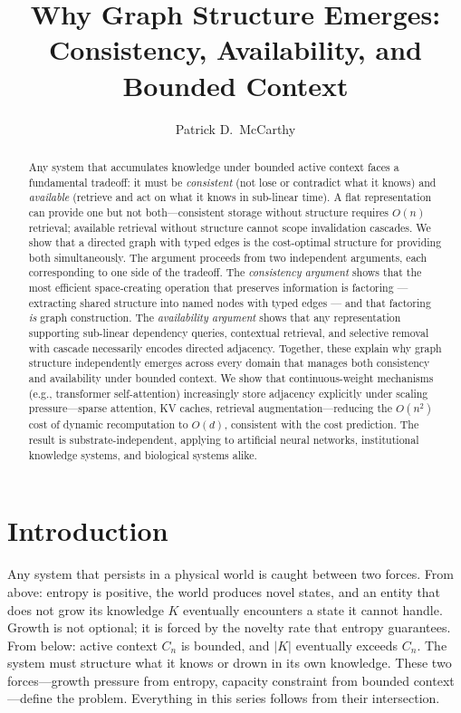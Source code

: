 \documentclass[11pt]{article}
\title{Why Graph Structure Emerges:\\Consistency, Availability, and Bounded Context}
\author{Patrick D.\ McCarthy}
\date{}
\theoremstyle{definition}
\begin{document}
\maketitle

\begin{abstract}
Any system that accumulates knowledge under bounded active context
faces a fundamental tradeoff: it must be \emph{consistent}
(not lose or contradict what it knows) and \emph{available}
(retrieve and act on what it knows in sub-linear time). A flat
representation can provide one but not both---consistent storage
without structure requires $O(n)$ retrieval; available retrieval
without structure cannot scope invalidation cascades.
We show that a directed graph with typed edges is the cost-optimal
structure for providing both simultaneously. The argument proceeds
from two independent arguments, each corresponding to one side of
the tradeoff. The \emph{consistency argument} shows that the most efficient
space-creating operation that preserves information is factoring
--- extracting shared structure into named nodes with typed edges ---
and that factoring \emph{is} graph construction. The
\emph{availability argument} shows that any representation supporting
sub-linear dependency queries, contextual retrieval, and selective
removal with cascade necessarily encodes directed adjacency.
Together, these explain why graph structure independently emerges
across every domain that manages both consistency and availability
under bounded context.
We show that continuous-weight mechanisms (e.g., transformer
self-attention) increasingly store adjacency explicitly under scaling
pressure---sparse attention, KV caches, retrieval augmentation---reducing
the $O(n^2)$ cost of dynamic recomputation to $O(d)$, consistent with
the cost prediction. The result is substrate-independent, applying
to artificial neural networks, institutional knowledge systems, and
biological systems alike.
\end{abstract}

\section{Introduction}
\label{sec:intro}

Any system that persists in a physical world is caught between two
forces. From above: entropy is positive, the world produces novel
states, and an entity that does not grow its knowledge $K$ eventually
encounters a state it cannot handle. Growth is not optional; it is
forced by the novelty rate that entropy guarantees. From below:
active context $C_n$ is bounded, and $|K|$ eventually exceeds $C_n$.
The system must structure what it knows or drown in its own
knowledge. These two forces---growth pressure from entropy, capacity
constraint from bounded context---define the problem. Everything in
this series follows from their intersection.
\end{document}
